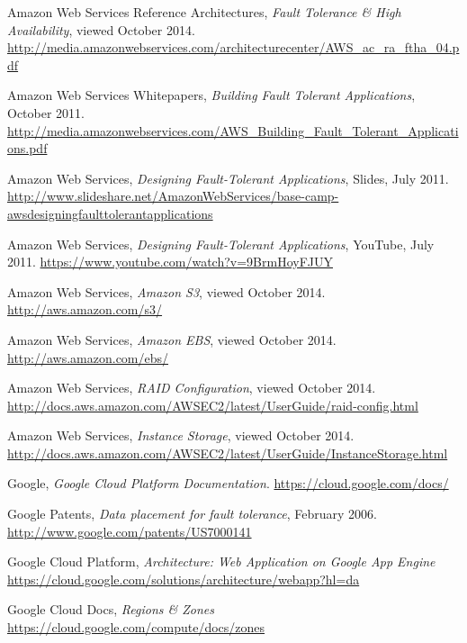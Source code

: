 \documentclass[11pt]{report}
\begin{document}
\begin{thebibliography}{99}

	Amazon Web Services Reference Architectures, \emph{Fault Tolerance \& High Availability}, viewed October 2014.
	\url{http://media.amazonwebservices.com/architecturecenter/AWS_ac_ra_ftha_04.pdf}
	
	Amazon Web Services Whitepapers, \emph{Building Fault Tolerant Applications}, October 2011.
	\url{http://media.amazonwebservices.com/AWS_Building_Fault_Tolerant_Applications.pdf}
	
	Amazon Web Services, \emph{Designing Fault-Tolerant Applications}, Slides, July 2011.
	\url{http://www.slideshare.net/AmazonWebServices/base-camp-awsdesigningfaulttolerantapplications}
	
	Amazon Web Services, \emph{Designing Fault-Tolerant Applications}, YouTube, July 2011.
	\url{https://www.youtube.com/watch?v=9BrmHoyFJUY}

	Amazon Web Services, \emph{Amazon S3}, viewed October 2014.
	\url{http://aws.amazon.com/s3/}
	
	Amazon Web Services, \emph{Amazon EBS}, viewed October 2014.
	\url{http://aws.amazon.com/ebs/}

	Amazon Web Services, \emph{RAID Configuration}, viewed October 2014.
	\url{http://docs.aws.amazon.com/AWSEC2/latest/UserGuide/raid-config.html}
	
	Amazon Web Services, \emph{Instance Storage}, viewed October 2014.
	\url{http://docs.aws.amazon.com/AWSEC2/latest/UserGuide/InstanceStorage.html}

	Google, \emph{Google Cloud Platform Documentation}.
	\url{https://cloud.google.com/docs/}	
	
	Google Patents, \emph{Data placement for fault tolerance}, February 2006.
	\url{http://www.google.com/patents/US7000141}
	
	Google Cloud Platform, \emph{Architecture: Web Application on Google App Engine}
	\url{https://cloud.google.com/solutions/architecture/webapp?hl=da}
	
\bibitem{}
	Google Cloud Docs, \emph{Regions \& Zones}
	\url{https://cloud.google.com/compute/docs/zones}
	

\end{thebibliography}
\end{document}
